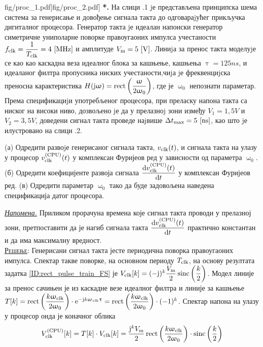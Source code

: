 \newpage
\begin{slikaDesno}{fig/proc_1.pdf}[fig/proc_2.pdf]
    \noindent
    \textbf{{\color{red}*}\ID.}
    На слици \ID.1 jе представљена принципска шема система за
    генерисање и довођење сигнала такта до одговараjућег прикључка
    дигиталног процесора. Генератор такта jе идеалан напонски
    генератор симетричне униполарне поворке правоугаоних импулса
    учестаности
    $f_{\rm clk} = \dfrac{1}{T_{\rm clk}} = 4\,\left[\mathrm{MHz}\right]$
    и амплитуде $V_{\rm m} = 5\,\left[\mathrm{V}\right]$. 
    Линиjа за пренос такта моделуjе се као као каскадна
    веза идеалног блока за кашњење, кашњења 
    $\uptau = 125\unit{ns}$, и идеаланог филтра пропусника ниских учестаности,чиjа
    jе фреквенциjска преносна карактеристика 
    $H({\rm j}\upomega) = \operatorname{rect}\left( \dfrac{\upomega}{2\upomega_0} \right)$, где је 
    $\upomega_0$ непознати параметар. 
    Према спецификациjи употребљеног процесора, при
    преласку напона такта са ниског на високи ниво, дозвољено jе
    да у прелазноj зони између $V_1 = 1,5\unit{V}$ и $V_2 = 3,5\unit{V}$, доведени сигнал такта
    проведе наjвише 
    $\Delta t_{\rm max} = 5\,\left[\mathrm{ns}\right]$, као што jе илустровано на слици \ID.2. 
    \end{slikaDesno}

    (а) Одредити развоjе генерисаног сигнала такта, $v_{\rm clk}(t)$, и сигнала такта
    на улазу у процесор $v_{\rm clk}^{\rm(CPU)}(t)$ у комплексан Фуријеов ред у зависности 
    од параметра $\upomega_0$.
    (б) Одредити коефицијенте развоја сигнала $\dfrac{{\rm d} v_{\rm clk}^{\rm (CPU)}(t)}{{\rm d} t}$ 
    у комплексан Фуријеов ред.  
    (в) Одредити параметар $\upomega_0$ тако да буде задовољена наведена спецификација датог 
    процесора. 

    \underline{\it Напомена.} Приликом прорачуна времена које сигнал такта проводи у 
    прелазној зони, претпоставити да је нагиб сигнала такта 
    $\dfrac{{\rm d} v_{\rm clk}^{\rm (CPU)}(t)}{{\rm d} t}$ практично константан и да има максималну 
    вредност. \\

    \textsc{\underline{Решење}}: Генерисани сигнал такта јесте периодична поворка правоугаоних импулса. 
    Спектар такве поворке, на основном периоду $T_{\rm clk}$, на основу резултата задатка 
    \ref{ID:rect_pulse_train_FS} је $V_{\rm clk}[k] = 
    (-{\rm j})^k \dfrac{V_{\rm m}}{2} \operatorname{sinc} \left(
    \dfrac{k}{2}
    \right) $.
    Модел линије за пренос сачињен је из каскадне везе идеалног филтра и линије за 
    кашњење $T[k] = \operatorname{rect} \left( \dfrac{k{\upomega_{\rm clk}}}{2\upomega_0} \right) 
    \cdot {\rm e}^{-{\rm j} k {\upomega_{\rm clk}\uptau}} = 
    \operatorname{rect} \left( \dfrac{k{\upomega_{\rm clk}}}{2\upomega_0} \right) 
    \cdot (-1)^k$. Спектар напона на улазу у процесор онда је коначног облика 
    \begin{equation}
        V_{\rm clk}^{\rm (CPU)}[k] 
        = T[k] \cdot V_{\rm clk}[k] 
        =  
        \dfrac{{\rm j}^{k} V_{\rm m}}{2}
        \operatorname{rect} \left( \dfrac{k{\upomega_{\rm clk}}}{2\upomega_0} \right) 
        \cdot
        \operatorname{sinc} \left(
        \dfrac{k}{2} \right)
    \end{equation}

